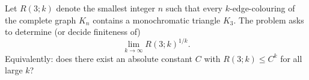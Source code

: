 Let $R(3;k)$ denote the smallest integer $n$ such that every $k$-edge-colouring of the complete
graph $K_n$ contains a monochromatic triangle $K_3$.
The problem asks to determine (or decide finiteness of)
\[
\lim_{k\to\infty} R(3;k)^{1/k}.
\]
Equivalently: does there exist an absolute constant $C$ with $R(3;k)\le C^k$ for all large $k$?
